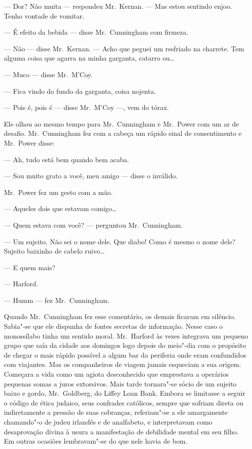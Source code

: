 --- Dor?  Não muita --- respondeu Mr.~Kernan.  --- Mas estou sentindo enjoo.
Tenho vontade de vomitar.

--- É efeito da bebida --- disse Mr.~Cunningham com firmeza.

--- Não --- disse Mr.~Kernan.  --- Acho que peguei um resfriado na charrete.
Tem alguma coisa que agarra na minha garganta, catarro ou\ldots{}

--- Muco --- disse Mr.~M’Coy.

--- Fica vindo do fundo da garganta, coisa nojenta.

--- Pois é, pois é --- disse Mr.~M’Coy ---, vem do tórax.

Ele olhou ao mesmo tempo para Mr.~Cunningham e Mr.~Power com um ar de desafio.
Mr.~Cunningham fez com a cabeça um rápido sinal de consentimento e Mr.~Power
disse:

--- Ah, tudo está bem quando bem acaba.

--- Sou muito grato a você, meu amigo --- disse o inválido.  

Mr.~Power fez um gesto com a mão.

--- Aqueles dois que estavam comigo\ldots{}

--- Quem estava com você? --- perguntou Mr.~Cunningham.

--- Um sujeito.  Não sei o nome dele.  Que diabo!  Como é mesmo o nome dele?
Sujeito baixinho de cabelo ruivo\ldots{}

--- E quem mais?

--- Harford.

--- Humm --- fez Mr.~Cunningham.

Quando Mr.~Cunningham fez esse comentário, os demais ficaram em silêncio.
Sabia"-se que ele dispunha de fontes secretas de informação.  Nesse caso o
monossílabo tinha um sentido moral.  Mr.~Harford às vezes integrava um pequeno
grupo que saía da cidade aos domingos logo depois do meio"-dia com o propósito
de chegar o mais rápido possível a algum bar da periferia onde eram confundidos
com viajantes.  Mas os companheiros de viagem jamais esqueciam a sua origem.
Começara a vida como um agiota desconhecido que emprestava a operários pequenas
somas a juros extorsivos.  Mais tarde tornara"-se sócio de um sujeito baixo e
gordo, Mr.~Goldberg, do Liffey Loan Bank.  Embora se limitasse a seguir o
código de ética judaico, seus confrades católicos, sempre que sofriam direta ou
indiretamente a pressão de suas cobranças, referiam"-se a ele amargamente
chamando"-o de judeu irlandês e de analfabeto, e interpretavam como desaprovação
divina à usura a manifestação de debilidade mental em seu filho.  Em outras
ocasiões lembravam"-se do que nele havia de bom.

